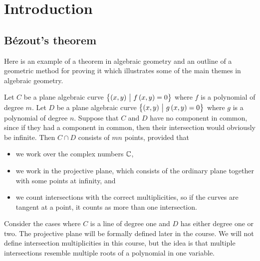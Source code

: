 \def\module{M4P33 Algebraic Geometry}
\def\lecturer{Prof Kevin Buzzard}
\def\term{Spring 2020}
\def\cover{}
\def\syllabus{}
\def\thm{section}







\section{Introduction}

\subsection{B\'ezout's theorem}


Here is an example of a theorem in algebraic geometry and an outline of a geometric method for proving it which illustrates some of the main themes in algebraic geometry.

\begin{theorem}[B\'ezout]
Let $ C $ be a plane algebraic curve $ \cbr{\br{x, y} \st f\br{x, y} = 0} $ where $ f $ is a polynomial of degree $ m $. Let $ D $ be a plane algebraic curve $ \cbr{\br{x, y} \st g\br{x, y} = 0} $ where $ g $ is a polynomial of degree $ n $. Suppose that $ C $ and $ D $ have no component in common, since if they had a component in common, then their intersection would obviously be infinite. Then $ C \cap D $ consists of $ mn $ points, provided that
\begin{itemize}
\item we work over the complex numbers $ \mathbb{C} $,
\item we work in the projective plane, which consists of the ordinary plane together with some points at infinity, and
\item we count intersections with the correct multiplicities, so if the curves are tangent at a point, it counts as more than one intersection.
\end{itemize}
\end{theorem}

Consider the cases where $ C $ is a line of degree one and $ D $ has either degree one or two. The projective plane will be formally defined later in the course. We will not define intersection multiplicities in this course, but the idea is that multiple intersections resemble multiple roots of a polynomial in one variable.

